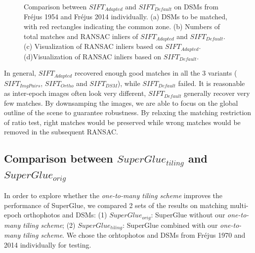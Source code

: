 \begin{figure}[htbp]
\begin{center}
{		}
		\caption{Comparison between $SIFT_{Adapted}$ and $SIFT_{Default}$ on DSMs from Fr{\'e}jus 1954 and Fr{\'e}jus 2014 individually. (a) DSMs to be matched, with red rectangles indicating the common zone. (b) Numbers of total matches and RANSAC inliers of $SIFT_{Adapted}$ and $SIFT_{Default}$. (c) Visualization of RANSAC inliers based on $SIFT_{Adapted}$. (d)Visualization of RANSAC inliers based on $SIFT_{Default}$.}
		\label{SIFTComp_DSM}
	\end{center}
\end{figure} 

In general, $SIFT_{Adapted}$ recovered enough good matches in all the 3 variants ($SIFT_{ImgPairs}$, $SIFT_{Ortho}$ and $SIFT_{DSM}$), while $SIFT_{Default}$ failed. It is reasonable as inter-epoch images often look very different, $SIFT_{Default}$ generally recover very few matches. By downsamping the images, we are able to focus on the global outline of the scene to guarantee robustness. 
By relaxing the matching restriction of ratio test, right matches would be preserved while wrong matches would be removed in the subsequent RANSAC.\\


\subsection{Comparison between $SuperGlue_{tiling}$ and $SuperGlue_{orig}$}
\label{Compare2SpGs}
In order to explore whether the \textit{one-to-many tiling scheme} improves the performance of SuperGlue, 
we compared 2 sets of the results on matching multi-epoch orthophotos and DSMs: (1) $SuperGlue_{orig}$: SuperGlue without our \textit{one-to-many tiling scheme}; (2) $SuperGlue_{tiling}$: SuperGlue combined with our \textit{one-to-many tiling scheme}. %
We chose the orhtophotos and DSMs from Fr{\'e}jus 1970 and 2014 individually for testing.\\
